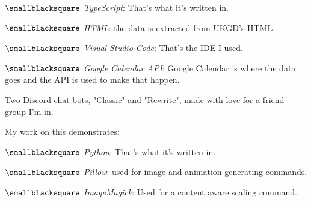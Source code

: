 \documentclass[10mm,letterpaper,notitlepage]{article}
\begin{document}
{{								$\smallblacksquare$ \textit{TypeScript}: That's what it's written in.
								
								$\smallblacksquare$ \textit{HTML}: the data is extracted from UKGD's HTML.
								
								$\smallblacksquare$ \textit{Visual Studio Code}: That's the IDE I used.
								
								$\smallblacksquare$ \textit{Google Calendar API}: Google Calendar is where the data goes and the API is used to make that happen.
								
								\setlength{\parindent}{\parindent-4mm}
							\par}
							{\color[RGB]{0, 0, 0}
							\fontsize{2.25mm}{3.0mm}\selectfont
									{\color[RGB]{108, 29, 169}
									\fontsize{4.5mm}{6.0mm}\selectfont
									\color[RGB]{96, 106, 187}{{ }}\color[RGB]{99, 94, 183}{{ }}\color[RGB]{102, 77, 178}{{ }}\color[RGB]{105, 61, 174}{{ }}
									\par}
							\nopagebreak
							Two Discord chat bots, "Classic" and "Rewrite", made with love for a friend group I'm in.
							
							\nopagebreak
							My work on this demonstrates:
								\setlength{\parindent}{\parindent+4mm}
								
								\nopagebreak
								$\smallblacksquare$ \textit{Python}: That's what it's written in.
								
								$\smallblacksquare$ \textit{Pillow}: used for image and animation generating commands.
								
								$\smallblacksquare$ \textit{ImageMagick}: Used for a content aware scaling command.
								
}}
\end{document}

